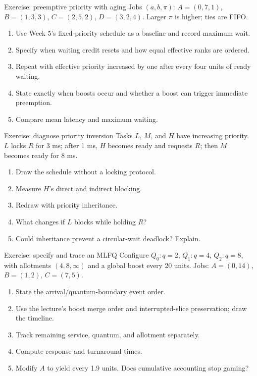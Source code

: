 \documentclass[aspectratio=169,11pt]{beamer}
\begin{document}
\begin{frame}{Exercise: preemptive priority with aging}
  Jobs $(a,b,\pi)$: $A=(0,7,1)$, $B=(1,3,3)$, $C=(2,5,2)$, $D=(3,2,4)$.
  Larger $\pi$ is higher; ties are FIFO.
  \begin{enumerate}
    \item Use Week 5's fixed-priority schedule as a baseline and record maximum wait.
    \item Specify when waiting credit resets and how equal effective ranks are ordered.
    \item Repeat with effective priority increased by one after every four units of ready waiting.
    \item State exactly when boosts occur and whether a boost can trigger immediate preemption.
    \item Compare mean latency and maximum waiting.
  \end{enumerate}
\end{frame}

\begin{frame}{Exercise: diagnose priority inversion}
  Tasks $L$, $M$, and $H$ have increasing priority. $L$ locks $R$ for 3 ms; after 1 ms, $H$ becomes ready and requests $R$; then $M$ becomes ready for 8 ms.
  \begin{enumerate}
    \item Draw the schedule without a locking protocol.
    \item Measure $H$'s direct and indirect blocking.
    \item Redraw with priority inheritance.
    \item What changes if $L$ blocks while holding $R$?
    \item Could inheritance prevent a circular-wait deadlock? Explain.
  \end{enumerate}
\end{frame}

\begin{frame}{Exercise: specify and trace an MLFQ}
  Configure $Q_0:q=2$, $Q_1:q=4$, $Q_2:q=8$, with allotments $(4,8,\infty)$ and a global boost every 20 units.
  Jobs: $A=(0,14)$, $B=(1,2)$, $C=(7,5)$.
  \begin{enumerate}
    \item State the arrival/quantum-boundary event order.
    \item Use the lecture's boost merge order and interrupted-slice preservation; draw the timeline.
    \item Track remaining service, quantum, and allotment separately.
    \item Compute response and turnaround times.
    \item Modify $A$ to yield every 1.9 units. Does cumulative accounting stop gaming?
  \end{enumerate}
\end{frame}
\end{document}
